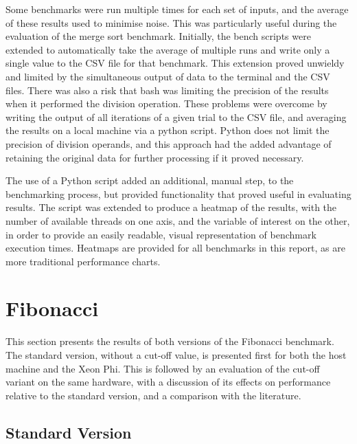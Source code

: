 \documentclass{report}
\begin{document}
Some benchmarks were run multiple times for each set of inputs, and the average of these results used to minimise noise. This was particularly useful during the evaluation of the merge sort benchmark. Initially, the bench scripts were extended to automatically take the average of multiple runs and write only a single value to the CSV file for that benchmark. This extension proved unwieldy and limited by the simultaneous output of data to the terminal and the CSV files. There was also a risk that bash was limiting the precision of the results when it performed the division operation. These problems were overcome by writing the output of all iterations of a given trial to the CSV file, and averaging the results on a local machine via a python script. Python does not limit the precision of division operands, and this approach had the added advantage of retaining the original data for further processing if it proved necessary.

The use of a Python script added an additional, manual step, to the benchmarking process, but provided functionality that proved useful in evaluating results. The script was extended to produce a heatmap of the results, with the number of available threads on one axis, and the variable of interest on the other, in order to provide an easily readable, visual representation of benchmark execution times. Heatmaps are provided for all benchmarks in this report, as are more traditional performance charts.

\section{Fibonacci} \label{Sec:evalfib}

This section presents the results of both versions of the Fibonacci benchmark. The standard version, without a cut-off value, is presented first for both the host machine and the Xeon Phi. This is followed by an evaluation of the cut-off variant on the same hardware, with a discussion of its effects on performance relative to the standard version, and a comparison with the literature.

\subsection{Standard Version} \label{Sec:evalfibstandard}
\end{document}
